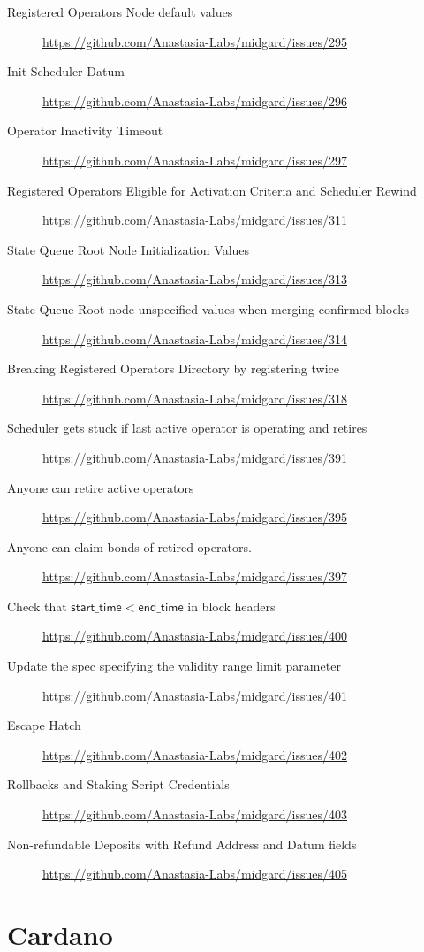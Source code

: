 \begin{description}
  \item[Registered Operators Node default values]\url{https://github.com/Anastasia-Labs/midgard/issues/295}
  \item[Init Scheduler Datum]\url{https://github.com/Anastasia-Labs/midgard/issues/296}
  \item[Operator Inactivity Timeout]\url{https://github.com/Anastasia-Labs/midgard/issues/297}
  \item[Registered Operators Eligible for Activation Criteria and Scheduler Rewind]\url{https://github.com/Anastasia-Labs/midgard/issues/311}
  \item[State Queue Root Node Initialization Values]\url{https://github.com/Anastasia-Labs/midgard/issues/313}
  \item[State Queue Root node unspecified values when merging confirmed blocks]\url{https://github.com/Anastasia-Labs/midgard/issues/314}
  \item[Breaking Registered Operators Directory by registering twice]\url{https://github.com/Anastasia-Labs/midgard/issues/318}
  \item[Scheduler gets stuck if last active operator is operating and retires]\url{https://github.com/Anastasia-Labs/midgard/issues/391}
  \item[Anyone can retire active operators]\url{https://github.com/Anastasia-Labs/midgard/issues/395}
  \item[Anyone can claim bonds of retired operators.]\url{https://github.com/Anastasia-Labs/midgard/issues/397}
  \item[Check that \(\mathsf{start\_time} < \mathsf{end\_time}\) in block headers]\url{https://github.com/Anastasia-Labs/midgard/issues/400}
  \item[Update the spec specifying the validity range limit parameter]\url{https://github.com/Anastasia-Labs/midgard/issues/401}
  \item[Escape Hatch]\url{https://github.com/Anastasia-Labs/midgard/issues/402}
  \item[Rollbacks and Staking Script Credentials]\url{https://github.com/Anastasia-Labs/midgard/issues/403}
  \item[Non-refundable Deposits with Refund Address and Datum fields]\url{https://github.com/Anastasia-Labs/midgard/issues/405}
   \end{description}


\section{Cardano}

